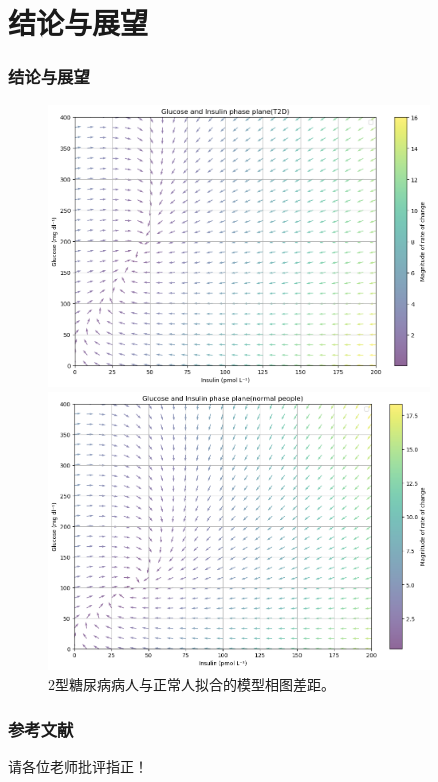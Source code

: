 \documentclass{beamer}
\begin{document}
\section{结论与展望}
\begin{frame}
    \frametitle{结论与展望}
    \begin{figure}[H]
        \begin{minipage}[t]{0.4\textwidth}
            \centering
            \includegraphics[width=0.9\textwidth]{Img/t2dphase.png}
        \end{minipage}
        \begin{minipage}[t]{0.4\textwidth}
            \centering
            \includegraphics[width=0.9\textwidth]{Img/normalphase.png}
        \end{minipage}
        \caption{2型糖尿病病人与正常人拟合的模型相图差距。}
    \end{figure}
\end{frame}

\begin{frame}
  \frametitle{参考文献}
\end{frame}

\begin{frame}

    \begin{center}
        \huge{请各位老师批评指正！}
    \end{center}

\end{frame}
\end{document}
